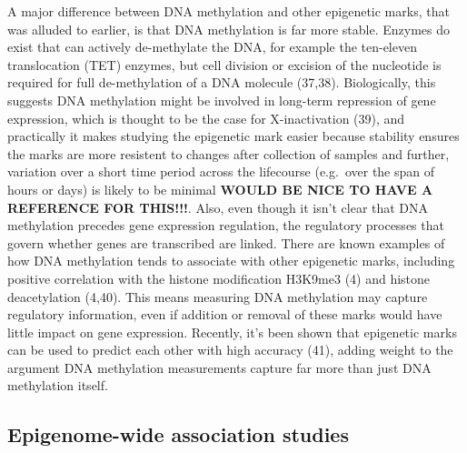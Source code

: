 \documentclass[11pt,twoside]{bristolthesis}
\begin{document}
A major difference between DNA methylation and other epigenetic marks, that was alluded to earlier, is that DNA methylation is far more stable. Enzymes do exist that can actively de-methylate the DNA, for example the ten-eleven translocation (TET) enzymes, but cell division or excision of the nucleotide is required for full de-methylation of a DNA molecule (37,38). Biologically, this suggests DNA methylation might be involved in long-term repression of gene expression, which is thought to be the case for X-inactivation (39), and practically it makes studying the epigenetic mark easier because stability ensures the marks are more resistent to changes after collection of samples and further, variation over a short time period across the lifecourse (e.g.~over the span of hours or days) is likely to be minimal \textbf{WOULD BE NICE TO HAVE A REFERENCE FOR THIS!!!}. Also, even though it isn't clear that DNA methylation precedes gene expression regulation, the regulatory processes that govern whether genes are transcribed are linked. There are known examples of how DNA methylation tends to associate with other epigenetic marks, including positive correlation with the histone modification H3K9me3 (4) and histone deacetylation (4,40). This means measuring DNA methylation may capture regulatory information, even if addition or removal of these marks would have little impact on gene expression. Recently, it's been shown that epigenetic marks can be used to predict each other with high accuracy (41), adding weight to the argument DNA methylation measurements capture far more than just DNA methylation itself.

\hypertarget{ewas}{%
\subsection{Epigenome-wide association studies}\label{ewas}}
\end{document}
